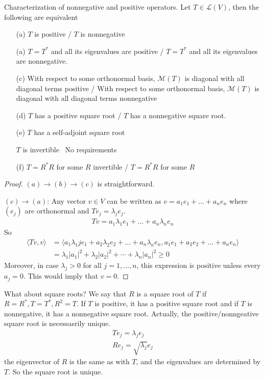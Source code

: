 \documentclass{article}
\begin{document}
Characterization of nonnegative and positive operators. Let $T \in  \mathcal{L}(V)$, then the following are equivalent
\begin{enumerate}
	\item [(a)] $T$ is positive / $T$ is nonnegative

	\item [(a)] $T = T^{*}$ and all its eigenvalues are positive / $T = T^{*}$ and all its eigenvalues are nonnegative.

	\item [(c)] With respect to some orthonormal basis, $\mathcal{M}(T)$ is diagonal with all diagonal terms positive / 
		With respect to some orthonormal basis, $\mathcal{M}(T)$ is diagonal with all diagonal terms nonnegative

	\item [(d)] $T$ has a positive square root / $T$ has a nonnegative square root.

	\item [(e)] $T$ has a self-adjoint square root 

		$T$ is invertible \ No requirements 

	\item [(f)] $T = R^{*}R$ for some $R$ invertible / $T = R^{*}R$ for some $R$
\end{enumerate}
\begin{proof}
	$(a) \rightarrow (b) \rightarrow (c)$ is straightforward. 

	$(c) \rightarrow (a)$: Any vector $v \in V$ can be written as $v = a_{1}e_{1} + \ldots + a_{n}e_{n}$ where $(e_{j})$ are orthonormal and $Te_{j} = \lambda_{j}e_{j}$.
	\begin{align*}
		Tv = a_{1}\lambda_{1}e_{1} + \ldots + a_{n}\lambda_{n}e_{n}
	\end{align*}
	So 
	\begin{align*}
		\langle Tv,v \rangle &= \langle a_{1}\lambda_{1}je_{1}+ a_{2}\lambda_{2}e_{2} + \ldots + a_{n}\lambda_{n}e_{n}, a_{1}e_{1} + a_{2}e_{2} + \ldots + a_{n}e_{n} \rangle \\
			    &= \lambda_{1}\lvert a_{1} \rvert^{2} + \lambda_{2}\lvert a_{2} \rvert^{2} + \cdots + \lambda_{n}\lvert a_{n} \rvert^{2} \geq 0
	\end{align*}
	Moreover, in case $\lambda_{j} > 0$ for all $j = 1, \ldots, n$, this expression is positive unless every $a_{j} = 0$. This would imply that $v = 0$.
\end{proof}

What about square roots? We say that $R$ is a square root of $T$ if $R = R^{*}, T= T^{*}, R^{2} = T$. If $T$ is positive, it has a positive square root and if $T$ is nonnegative, it has a nonnegative square root. Actually, the positive/nonngeative square root is necessasrily unique.
\begin{align*}
	Te_{j} = \lambda_{j}e_{j} \\
	Re_{j} = \sqrt{\lambda_{j}}e_{j}
\end{align*}
the eigenvector of $R$ is the same as with $T$, and the eigenvalues are determined by $T$. So the square root is unique.
\end{document}
